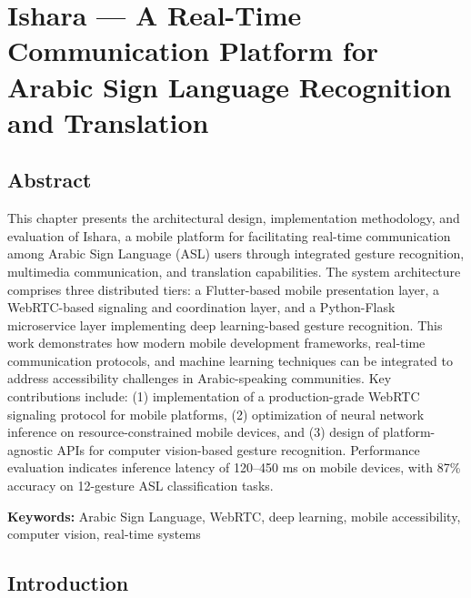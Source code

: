 \documentclass[11pt,a4paper,twoside]{report}
\begin{document}
\chapter{Ishara --- A Real-Time Communication Platform for Arabic Sign Language Recognition and Translation}
\label{ch:ishara}

\section*{Abstract}

This chapter presents the architectural design, implementation methodology, and evaluation of Ishara, a mobile platform for facilitating real-time communication among Arabic Sign Language (ASL) users through integrated gesture recognition, multimedia communication, and translation capabilities. The system architecture comprises three distributed tiers: a Flutter-based mobile presentation layer, a WebRTC-based signaling and coordination layer, and a Python-Flask microservice layer implementing deep learning-based gesture recognition. This work demonstrates how modern mobile development frameworks, real-time communication protocols, and machine learning techniques can be integrated to address accessibility challenges in Arabic-speaking communities. Key contributions include: (1) implementation of a production-grade WebRTC signaling protocol for mobile platforms, (2) optimization of neural network inference on resource-constrained mobile devices, and (3) design of platform-agnostic APIs for computer vision-based gesture recognition. Performance evaluation indicates inference latency of 120--450 ms on mobile devices, with 87\% accuracy on 12-gesture ASL classification tasks.

\vspace{0.5cm}
\noindent \textbf{Keywords:} Arabic Sign Language, WebRTC, deep learning, mobile accessibility, computer vision, real-time systems

\newpage

\section{Introduction}
\label{sec:introduction}
\end{document}
